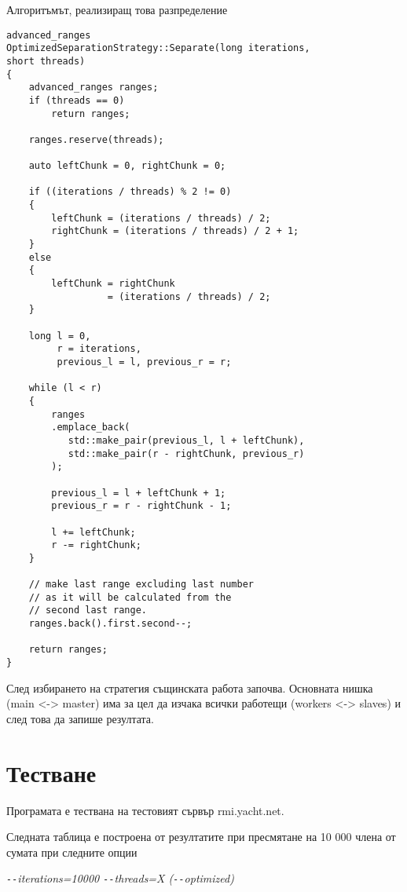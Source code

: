 \documentclass[a4paper,english]{article}
\begin{document}
\begin{itemize}
            Алгоритъмът, реализиращ това разпределение
            \begin{lstlisting}
advanced_ranges
OptimizedSeparationStrategy::Separate(long iterations, 
short threads)
{
	advanced_ranges ranges;
	if (threads == 0)
		return ranges;

	ranges.reserve(threads);

	auto leftChunk = 0, rightChunk = 0;
	
	if ((iterations / threads) % 2 != 0)
	{
		leftChunk = (iterations / threads) / 2;
		rightChunk = (iterations / threads) / 2 + 1;
	}
	else
	{
		leftChunk = rightChunk
		          = (iterations / threads) / 2;
	}

	long l = 0, 
	     r = iterations, 
	     previous_l = l, previous_r = r;

	while (l < r)
	{
		ranges
		.emplace_back(
		   std::make_pair(previous_l, l + leftChunk),
		   std::make_pair(r - rightChunk, previous_r)
		);

		previous_l = l + leftChunk + 1;
		previous_r = r - rightChunk - 1;

		l += leftChunk;
		r -= rightChunk;
	}

	// make last range excluding last number
	// as it will be calculated from the 
	// second last range.
	ranges.back().first.second--;

	return ranges;
}
            \end{lstlisting}
            
        \end{itemize}
        
        След избирането на стратегия същинската работа започва.
        Основната нишка (main <-> master) има за цел да изчака всички работещи (workers <-> slaves) и след това да запише резултата.
\section{Тестване}
    Програмата е тествана на тестовият сървър rmi.yacht.net.
    
    Следната таблица е построена от резултатите при пресмятане на 10 000 члена от сумата при следните опции
    \begin{center}
        \textit{\texttt{-{}-}iterations=10000 \texttt{-{}-}threads=X (\texttt{-{}-}optimized)}
    \end{center}
\end{document}
